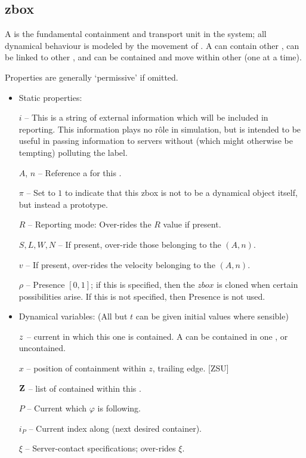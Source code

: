 \subsection{zbox}

A  is the fundamental containment and transport unit in the
system; all dynamical behaviour is modeled by the movement of
. A  can contain other , can be
linked to other , and can be contained and move within
other  (one at a time).

Properties are generally `permissive' if omitted.

\begin{itemize}
  \item Static properties:

    $i$ -- This is a string of external information which will be included in reporting.
    This information plays no r\^ole in simulation, but is intended to be useful in
    passing information to servers without (which might otherwise be tempting) polluting the label.
    
    $A$, $n$ -- Reference a  for this .

    $\pi$ -- Set to $1$ to indicate that this zbox is not to be a dynamical object itself, but instead a prototype. 

    $R$ -- Reporting mode: Over-rides the  $R$ value if present.

    $S,L,W,N$ -- If present, over-ride those belonging to the  $(A,n)$.
    
    $v$ -- If present, over-rides the velocity belonging to the  $(A,n)$.

    $\rho$ -- Presence $[0,1]$; if this is specified, then the $zbox$ is cloned when certain possibilities arise.
    If this is not specified, then Presence is not used.
    
  \item Dynamical variables: (All but $t$ can be given initial values where sensible)
        
    ${z}$ -- current  in which this one is
    contained. A  can be contained in one , or
    uncontained.
    
    $x$ -- position of containment within $z$, trailing edge. [ZSU]

    ${\bf Z}$ -- list of  contained within this .

    $P$ -- Current  which $\varphi$ is following.

    $i_P$ -- Current index along  (next desired container).

    $\xi$ -- Server-contact specifications; over-rides  $\xi$.

\end{itemize}

